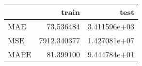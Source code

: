 \begin{tabular}{lrr}
\toprule
{} &        train &          test \\
\midrule
MAE  &    73.536484 &  3.411596e+03 \\
MSE  &  7912.340377 &  1.427081e+07 \\
MAPE &    81.399100 &  9.444784e+01 \\
\bottomrule
\end{tabular}
